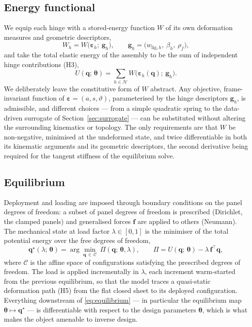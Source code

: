 \documentclass[pdflatex,sn-mathphys-num]{sn-jnl}%
\theoremstyle{thmstyleone}%
\theoremstyle{thmstyletwo}%
\theoremstyle{thmstylethree}%
\newcommand{\epsh}{\bm{\varepsilon}}
\begin{document}
\subsection{Energy functional}

We equip each hinge with a stored-energy function $W$ of its own deformation
measures and geometric descriptors,
\begin{equation}
  W_h = W\!\bigl(\epsh_h;\ \bm{g}_h\bigr),
  \qquad
  \bm{g}_h = \bigl(w_{\mathrm{lig},h},\ \beta_h,\ \rho_f\bigr),
  \label{eq:hinge-energy}
\end{equation}
and take the total elastic energy of the assembly to be the sum of independent
hinge contributions (H3),
\begin{equation}
  U(\bm{q};\,\bm{\theta}) = \sum_{h\in\mathcal{H}}
    W\!\bigl(\epsh_h(\bm{q});\ \bm{g}_h\bigr).
  \label{eq:total-energy}
\end{equation}
We deliberately leave the constitutive form of $W$ abstract. Any objective,
frame-invariant function of $\epsh=(a,s,\vartheta)$, parameterised by the hinge
descriptors $\bm{g}_h$, is admissible, and different choices --- from a simple
quadratic spring to the data-driven surrogate of
Section~\ref{sec:surrogate} --- can be substituted without altering the
surrounding kinematics or topology. The only requirements are that $W$ be
non-negative, minimised at the undeformed state, and twice differentiable in both
its kinematic arguments and its geometric descriptors, the second derivative being
required for the tangent stiffness of the equilibrium solve.

\subsection{Equilibrium}

Deployment and loading are imposed through boundary conditions on the panel
degrees of freedom: a subset of panel degrees of freedom is prescribed (Dirichlet,
the clamped panels) and generalised forces $\bm{f}$ are applied to others
(Neumann). The mechanical state at load factor $\lambda\in[0,1]$ is the minimiser
of the total potential energy over the free degrees of freedom,
\begin{equation}
  \bm{q}^\star(\lambda;\,\bm{\theta})
    = \arg\min_{\bm{q}\,\in\,\mathcal{C}}
      \ \Pi(\bm{q};\,\bm{\theta},\lambda),
  \qquad
  \Pi = U(\bm{q};\,\bm{\theta}) - \lambda\,\bm{f}^\top \bm{q},
  \label{eq:equilibrium}
\end{equation}
where $\mathcal{C}$ is the affine space of configurations satisfying the
prescribed degrees of freedom. The load is applied incrementally in $\lambda$,
each increment warm-started from the previous equilibrium, so that the model
traces a quasi-static deformation path (H5) from the flat closed sheet to its
deployed configuration. Everything downstream of \eqref{eq:equilibrium} --- in
particular the equilibrium map $\bm{\theta} \mapsto \bm{q}^\star$ --- is
differentiable with respect to the design parameters $\bm{\theta}$, which is what
makes the object amenable to inverse design.
\end{document}
